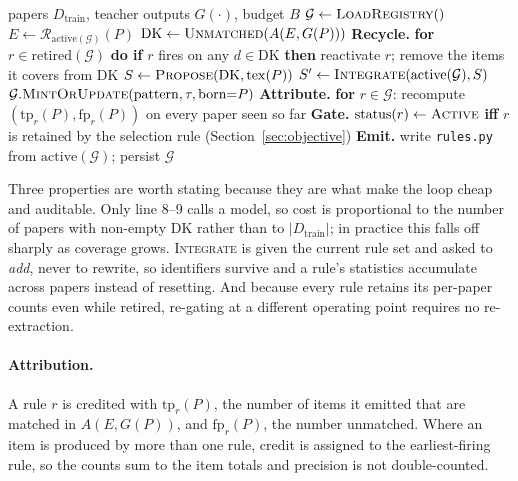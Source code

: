 \begin{algorithm}
\caption{Distillation over a training stream}
\label{alg:distill}
\begin{algorithmic}[1]
\Require papers $D_{\mathrm{train}}$, teacher outputs $G(\cdot)$, budget $B$
\State $\mathcal{G} \gets \textsc{LoadRegistry}()$
  \State $E \gets \mathcal{R}_{\mathrm{active}(\mathcal{G})}(P)$
  \State $\mathrm{DK} \gets \textsc{Unmatched}(A(E, G(P)))$
  \Statex
  \State \textbf{Recycle.} \textbf{for} $r \in \mathrm{retired}(\mathcal{G})$
    \textbf{do if} $r$ fires on any $d \in \mathrm{DK}$ \textbf{then}
    reactivate $r$; remove the items it covers from $\mathrm{DK}$
  \Statex
    \State $S \gets \textsc{Propose}(\mathrm{DK}, \mathrm{tex}(P))$
    \State $S' \gets \textsc{Integrate}(\mathrm{active}(\mathcal{G}), S)$
      \State $\mathcal{G}.\textsc{MintOrUpdate}(\text{pattern}, \tau,
        \text{born}{=}P)$
    \EndFor
  \EndIf
  \Statex
  \State \textbf{Attribute.} \textbf{for} $r \in \mathcal{G}$: recompute
    $(\mathrm{tp}_r(P), \mathrm{fp}_r(P))$ on every paper seen so far
  \State \textbf{Gate.} $\mathrm{status}(r) \gets \textsc{Active}$ \textbf{iff}
    $r$ is retained by the selection rule (Section~\ref{sec:objective})
  \State \textbf{Emit.} write \texttt{rules.py} from
    $\mathrm{active}(\mathcal{G})$; persist $\mathcal{G}$
\EndFor
\end{algorithmic}
\end{algorithm}

Three properties are worth stating because they are what make the loop cheap and
auditable. Only line 8--9 calls a model, so cost is proportional to the number of
papers with non-empty $\mathrm{DK}$ rather than to $|D_{\mathrm{train}}|$; in
practice this falls off sharply as coverage grows. \textsc{Integrate} is given
the current rule set and asked to \emph{add}, never to rewrite, so identifiers
survive and a rule's statistics accumulate across papers instead of resetting.
And because every rule retains its per-paper counts even while retired,
re-gating at a different operating point requires no re-extraction.

\paragraph{Attribution.}
A rule $r$ is credited with $\mathrm{tp}_r(P)$, the number of items it emitted
that are matched in $A(E, G(P))$, and $\mathrm{fp}_r(P)$, the number unmatched.
Where an item is produced by more than one rule, credit is assigned to the
earliest-firing rule, so the counts sum to the item totals and precision is not
double-counted.

